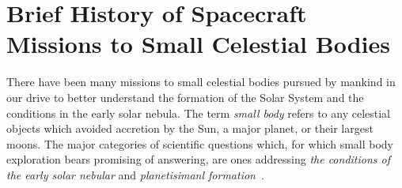 \cite{Rivkin2021}







\cite{Marks2022}




%


\section{Brief History of Spacecraft Missions to Small Celestial Bodies}

There have been many missions to small celestial bodies pursued by mankind in
our drive to better understand the formation of the Solar System and the
conditions in the early solar nebula. The term \textit{small body} refers to any
celestial objects which avoided accretion by the Sun, a major planet, or their
largest moons. The major categories of scientific questions which, for which
small body exploration bears promising of answering, are ones addressing
\textit{the conditions of the early solar nebular} and \textit{planetisimanl
formation}~\cite{Davidsson2021}.